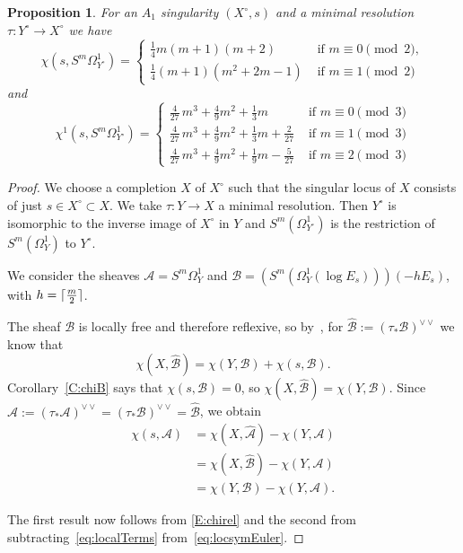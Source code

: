 \documentclass[12pt, reqno]{amsart}
\DeclarePairedDelimiter{\ceil}{\lceil}{\rceil}
\newtheorem{proposition}[lemma]{Proposition}
\theoremstyle{definition}
\newcommand{\calA}{{\mathcal A}}
\newcommand{\calB}{{\mathcal B}}
\numberwithin{equation}{section}
\numberwithin{table}{section}
\begin{document}
\begin{proposition}\label{P:local_chi}
For an $A_1$ singularity $(X^\circ,s)$ and a minimal resolution $\tau\colon Y^\circ\to X^\circ$ we have
	\begin{equation}
		\label{eq:locsymEuler}
		\chi(s,S^m\Omega_{Y^\circ}^1) = 
		\begin{cases}
			\displaystyle
			\tfrac{1}{4}m(m+1)(m+2) & \text{ if }m \equiv 0\pmod{2}, \\
			\displaystyle
			\tfrac{1}{4}(m+1)(m^2 + 2m - 1) & \text{ if }m \equiv 1\pmod{2}
		\end{cases}
	\end{equation}
and
\begin{equation}\label{E:local_chi1}
\chi^1(s,S^m\Omega^1_{Y^\circ})=
\begin{cases}
{\frac {4}{27}}\,{m}^{3}+\frac{4}{9}{m}^{2}+\frac{1}{3}m&\text{ if }m\equiv 0\pmod{3}\\
{\frac {4}{27}}\,{m}^{3}+\frac{4}{9}{m}^{2}+\frac{1}{3}m+{\frac{2}{27}}&\text{ if }m\equiv 1\pmod{3}\\
{\frac {4}{27}}\,{m}^{3}+\frac{4}{9}{m}^{2}+\frac{1}{9}m-{\frac{5}{27}}&\text{ if }m\equiv 2\pmod{3}
\end{cases}
\end{equation}
\end{proposition}

\begin{proof}
We choose a completion $X$ of $X^\circ$ such that the singular locus of $X$ consists of just $s\in X^\circ\subset X$. We take $\tau\colon Y\to X$ a minimal resolution. Then $Y^\circ$ is isomorphic to the inverse image of $X^\circ$ in $Y$ and $S^{m}(\Omega^1_{Y^\circ})$ is the restriction of $S^{m}(\Omega^1_{Y})$ to $Y^\circ$.

We consider the sheaves $\calA=S^m\Omega^1_{Y}$ and $\calB=(S^m(\Omega^1_{Y}(\log E_s)))(-hE_s)$, with $h=\ceil{ \frac{m}{2}}$. 

The sheaf $\calB$ is locally free and therefore reflexive, so
by~\cite[Lemma on p.\ 30]{Blache}, for $\hat\calB := (\tau_*\calB)^{\vee\vee}$ we know that
\[
\chi(X,\hat\calB) = \chi(Y,\calB) + \chi(s,\calB).
\]
Corollary~\ref{C:chiB} says that $\chi(s,\calB) = 0$, so $\chi(X,\hat\calB) = \chi(Y,\calB)$. Since $\hat\calA:=(\tau_*\calA)^{\vee\vee}=(\tau_*\calB)^{\vee\vee} = \hat\calB$, we obtain
\begin{align*}
\chi(s,\calA) &= \chi(X,\hat\calA) - \chi(Y,\calA) \\
&= \chi(X,\hat\calB) - \chi(Y,\calA)\\
&= \chi(Y,\calB) - \chi(Y,\calA).
\end{align*}

The first result now follows from \eqref{E:chirel} and the second from subtracting~\eqref{eq:localTerms} from~\eqref{eq:locsymEuler}.
\end{proof}
\end{document}
